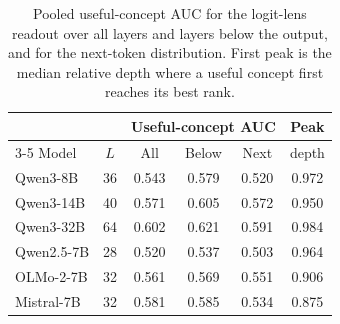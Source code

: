 \begin{table}[!htbp]
\centering
\caption{Pooled useful-concept AUC for the logit-lens readout over all layers and layers below the output, and for the next-token distribution. First peak is the median relative depth where a useful concept first reaches its best rank.}
\label{tab:peaklayer}
\footnotesize
\setlength{\tabcolsep}{2.2pt}
\begin{tabular}{lccccc}
\toprule
 & & \multicolumn{3}{c}{Useful-concept AUC} & Peak \\
\cmidrule(lr){3-5}
Model & $L$ & All & Below & Next & depth \\
\midrule
Qwen3-8B & 36 & 0.543 & 0.579 & 0.520 & 0.972 \\
Qwen3-14B & 40 & 0.571 & 0.605 & 0.572 & 0.950 \\
Qwen3-32B & 64 & 0.602 & 0.621 & 0.591 & 0.984 \\
Qwen2.5-7B & 28 & 0.520 & 0.537 & 0.503 & 0.964 \\
OLMo-2-7B & 32 & 0.561 & 0.569 & 0.551 & 0.906 \\
Mistral-7B & 32 & 0.581 & 0.585 & 0.534 & 0.875 \\
\bottomrule
\end{tabular}
\end{table}
